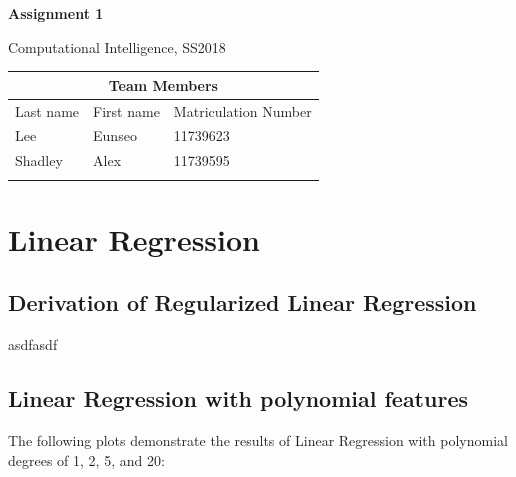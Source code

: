 \documentclass[a4paper]{article}
\begin{document}
\begin{titlepage}
	\centering
	{\huge \bf Assignment 1\par}
	\vspace{1cm}
	{\Large Computational Intelligence, SS2018\par}
	\vspace{1cm}
	\begin{tabular}{|l|l|l|}
	\hline
	\multicolumn{3}{|c|}{\textbf{Team Members}}   \\ \hline
	Last name & First name & Matriculation Number \\ \hline
	Lee       & Eunseo     & 11739623             \\ \hline
	Shadley   & Alex       & 11739595             \\ \hline
	          &            &                      \\ \hline
	\end{tabular}
\end{titlepage}

\section{Linear Regression}
\subsection{Derivation of Regularized Linear Regression}
asdfasdf

\subsection{Linear Regression with polynomial features}

The following plots demonstrate the results of Linear Regression with polynomial degrees of 1, 2, 5, and 20:
\end{document}

